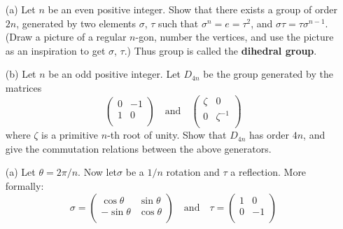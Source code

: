 \documentclass[12pt]{book}
\newcounter{myenumi}
\newenvironment{myenumerate}
{\begin{enumerate}
 \setcounter{enumi}{\themyenumi}
}
{\setcounter{myenumi}{\theenumi}
 \end{enumerate}}
\begin{document}
\begin{myenumerate}
\begin{excopy}
\begin{itemize}
 \item[(a)]
   Let $n$ be an even positive integer. Show that there exists  a group
   of order \(2n\), generated by two elements \(\sigma\), \(\tau\)
   such that \(\sigma^n=e=\tau^2\), and \(\sigma\tau=\tau\sigma^{n-1}\).
   (Draw a picture of a regular $n$-gon, number the vertices,
   and use the picture as an inspiration to get \(\sigma\), \(\tau\).)
   Thus group is called the
    
   \textbf{dihedral group}.
 \item[(b)]
   Let $n$ be an odd positive integer. Let \(D_{4n}\) be the group generated
   by the matrices
   \begin{equation}
     \left(
      \begin{array}{lr}
       0 & -1 \\
       1 & 0 \\
      \end{array}
     \right)
     \quad\textrm{and}\quad
     \left(
      \begin{array}{lc}
       \zeta & 0 \\
       0 & \zeta^{-1} \\
      \end{array}
     \right)
   \end{equation}
   where \(\zeta\) is a primitive $n$-th root of unity. Show that \(D_{4n}\)
   has order \(4n\), and give the commutation relations between the above
   generators.
\end{itemize}
\end{excopy}

\begin{itemize}
 \item[(a)]
 Let \(\theta=2\pi/n\). Now let\(\sigma\) be a \(1/n\) rotation
 and \(\tau\) a reflection. More formally:
   \begin{equation}
     \sigma = \left(
      \begin{array}{rl}
       \cos\theta & \sin\theta \\
       -\sin\theta & \cos\theta \\
      \end{array}
     \right)
     \quad\textrm{and}\quad
     \tau = \left(
      \begin{array}{lr}
       1 & 0 \\
       0 & -1 \\
      \end{array}
     \right)
   \end{equation}


\end{itemize}
\end{myenumerate}
\end{document}
